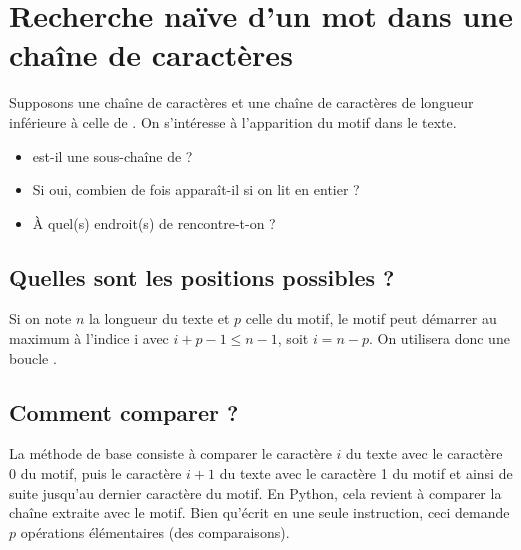 \section{Recherche naïve d'un mot dans une chaîne de caractères}
Supposons    une chaîne de caractères et  une chaîne de caractères de longueur inférieure à celle de . On s'intéresse à l'apparition du motif dans le texte.
\begin{itemize}
  \item {} est-il une sous-chaîne de ? 
  \item Si oui, combien de fois  apparaît-il si on lit  en entier ?
  \item À quel(s) endroit(s) de  rencontre-t-on  ? 
\end{itemize}
\subsection*{Quelles sont les positions possibles ?}
Si on note $n$ la longueur du texte et $p$ celle du motif, le motif peut démarrer au maximum à l'indice i avec $i + p - 1\le n-1 $, soit $i = n-p$. On utilisera donc une boucle .
\subsection*{Comment comparer ?}
La méthode de base consiste à comparer le caractère $i$ du texte avec le caractère 0 du motif, puis le caractère $i+1$ du texte avec le caractère 1 du motif et ainsi de suite jusqu'au dernier caractère du motif. En Python, cela revient à comparer la chaîne extraite  avec le motif. Bien qu'écrit en une seule instruction, ceci demande $p$ opérations élémentaires (des comparaisons).

